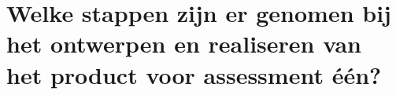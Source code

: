 \section{Welke stappen zijn er genomen bij het ontwerpen en realiseren van het product voor assessment één?}